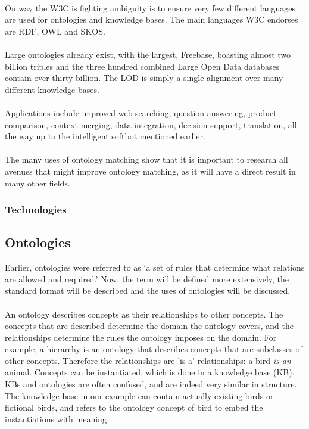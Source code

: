 \documentclass{article}
\begin{document}
 \paragraph{}
 On way the W3C is fighting ambiguity is to ensure very few different languages are used for ontologies and knowledge bases. The main languages W3C endorses are RDF, OWL and SKOS\cite{rdf, owl, skos}. 
 \paragraph{}
 Large ontologies already exist, with the largest, Freebase, boasting almost two billion triples and the three hundred combined Large Open Data databases contain over thirty billion\cite{dbpedia, lod}. The LOD is simply a single alignment over many different knowledge bases.
 \paragraph{}
 Applications include improved web searching, question answering, product comparison, context merging, data integration, decision support, translation, all the way up to the intelligent softbot mentioned earlier. \cite{schreiber, future}
 \paragraph{}
 The many uses of ontology matching show that it is important to research all avenues that might improve ontology matching, as it will have a direct result in many other fields.
 \subsubsection{Technologies}
 
 \subsection{Ontologies}
 Earlier, ontologies were referred to as `a set of rules that determine what relations are allowed and required.' Now, the term will be defined more extensively, the standard format will be described and the uses of ontologies will be discussed.
 \paragraph{}
 An ontology describes concepts as their relationships to other concepts. The concepts that are described determine the domain the ontology covers, and the relationships determine the rules the ontology imposes on the domain. For example, a hierarchy is an ontology that describes concepts that are subclasses of other concepts. Therefore the relationships are 'is-a' relationships: a bird \emph{is an} animal.
 Concepts can be instantiated, which is done in a knowledge base (KB). KBs and ontologies are often confused, and are indeed very similar in structure. The knowledge base in our example can contain actually existing birds or fictional birds, and refers to the ontology concept of bird to embed the instantiations with meaning\cite{ontologyGuru}.
 
\end{document}
